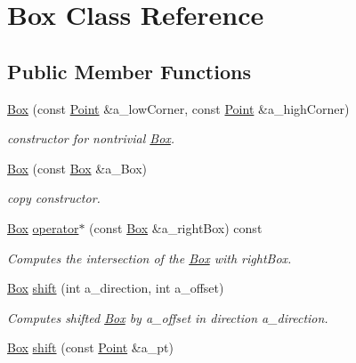 \hypertarget{classBox}{}\section{Box Class Reference}
\label{classBox}
\subsection*{Public Member Functions}
\begin{DoxyCompactItemize}
\item 
\hypertarget{classBox_a2b61d9eaf29e8f8aa2d29d89a19c6b7c}{}\hyperlink{classBox_a2b61d9eaf29e8f8aa2d29d89a19c6b7c}{Box} (const \hyperlink{classPoint}{Point} \&a\+\_\+low\+Corner, const \hyperlink{classPoint}{Point} \&a\+\_\+high\+Corner)\label{classBox_a2b61d9eaf29e8f8aa2d29d89a19c6b7c}

\begin{DoxyCompactList}\small\item\em constructor for nontrivial \hyperlink{classBox}{Box}. \end{DoxyCompactList}\item 
\hypertarget{classBox_a54f52432a78be9bd16c396da95496798}{}\hyperlink{classBox_a54f52432a78be9bd16c396da95496798}{Box} (const \hyperlink{classBox}{Box} \&a\+\_\+\+Box)\label{classBox_a54f52432a78be9bd16c396da95496798}

\begin{DoxyCompactList}\small\item\em copy constructor. \end{DoxyCompactList}\item 
\hypertarget{classBox_aa636abea0cb64dbbeab47ffd659ddd2f}{}\hyperlink{classBox}{Box} \hyperlink{classBox_aa636abea0cb64dbbeab47ffd659ddd2f}{operator$\ast$} (const \hyperlink{classBox}{Box} \&a\+\_\+right\+Box) const \label{classBox_aa636abea0cb64dbbeab47ffd659ddd2f}

\begin{DoxyCompactList}\small\item\em Computes the intersection of the \hyperlink{classBox}{Box} with right\+Box. \end{DoxyCompactList}\item 
\hypertarget{classBox_a366054107f5e2d32836b8b666e10a3e2}{}\hyperlink{classBox}{Box} \hyperlink{classBox_a366054107f5e2d32836b8b666e10a3e2}{shift} (int a\+\_\+direction, int a\+\_\+offset)\label{classBox_a366054107f5e2d32836b8b666e10a3e2}

\begin{DoxyCompactList}\small\item\em Computes shifted \hyperlink{classBox}{Box} by a\+\_\+offset in direction a\+\_\+direction. \end{DoxyCompactList}\item 
\hypertarget{classBox_a510ddbb4442c8dc1801c5e4d5a3c6cd0}{}\hyperlink{classBox}{Box} \hyperlink{classBox_a510ddbb4442c8dc1801c5e4d5a3c6cd0}{shift} (const \hyperlink{classPoint}{Point} \&a\+\_\+pt)\label{classBox_a510ddbb4442c8dc1801c5e4d5a3c6cd0}


\end{DoxyCompactItemize}
